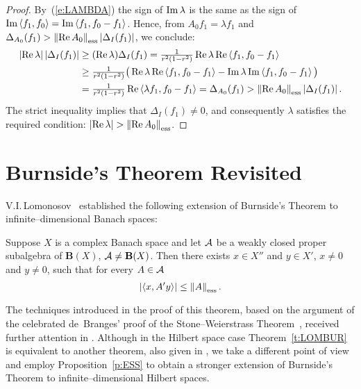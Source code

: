 \begin{proof}
By~(\ref{e:LAMBDA}) the sign of $\operatorname{Im}\lambda$ is the same as the sign of
$\operatorname{Im}\left<f_1,f_0\right>=\operatorname{Im}\left<f_1,f_0-f_1\right>$. Hence, from $A_0f_1=\lambda{}f_1$
and $\Delta_{A_0}(f_1)>\essnorm{\RE{}A_0}\abs{\Delta_I(f_1)}$, we conclude:
\begin{equation*}
  \begin{split}
     \abs{\RE\lambda}\abs{\Delta_I(f_1)} &\geq (\RE\lambda)\Delta_I(f_1) =
         \tfrac{1}{r^2(1-r^2)}\RE\lambda \RE\seq{f_1, f_0-f_1} \\
   &\geq \tfrac{1}{r^2(1-r^2)}\big(\RE\lambda\RE\seq{f_1, f_0-f_1}-
                                   \IM\lambda\IM\seq{f_1, f_0-f_1}\big) \\
   &= \tfrac{1}{r^2(1-r^2)}\RE\seq{\lambda f_1,f_0-f_1} = \Delta_{A_0}(f_1)
    > \essnorm{\RE{}A_0}\abs{\Delta_I(f_1)}.
  \end{split}
\end{equation*}
The strict inequality implies that $\Delta_I(f_1)\neq0$, and consequently
$\lambda$ satisfies the required condition:
$\abs{\RE\lambda}>\essnorm{\RE{}A_0}$.
\end{proof}

\goodbreak
\section{Burnside's Theorem Revisited}

V.I.\,Lomonosov~\cite{Lom91} established the following extension of
Burnside's Theorem to infinite--dimensional Banach spaces:

\begin{thm}[V.I.\,Lomonosov, 1991]\label{t:LOMBUR}
Suppose $X$ is a complex Banach space and let ${\cal A}$ be a weakly closed proper
subalgebra of $\mathbf{B}(X)$, ${\cal A}\neq\mathbf{B}(X)$. Then there exists
$x\in{X''}$ and $y\in{X'}$, $x\neq0$ and $y\neq0$, such that for every
$A\in{\cal A}$
\begin{equation}\label{e:LB}
 \abs{\seq{x,A'y}}\leq\essnorm{A}.
\end{equation}
\end{thm}

\medskip

The techniques introduced in the proof of this theorem, based on the argument
of the celebrated de~Branges' proof of the Stone--Weierstrass
Theorem~\cite{dB59}, received further attention in \cite{AAB95,dB93}.
Although in the Hilbert space case Theorem~\ref{t:LOMBUR} is equivalent to
another theorem, also given in \cite{Lom91}, we take a different point of
view and employ Proposition~\ref{p:ESS} to obtain a stronger extension of
Burnside's Theorem to infinite--dimensional Hilbert spaces.

